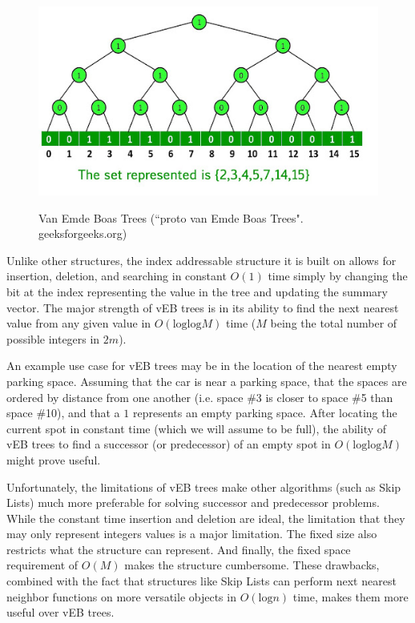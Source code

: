 \documentclass{article}
\begin{document}
\begin{figure}[h]
    \centering
    \includegraphics[scale=0.5,keepaspectratio]{Images/vebtree.jpg}
    \label{fig:veb_tree}
    \caption{Van Emde Boas Trees (``proto van Emde Boas Trees". geeksforgeeks.org)}
\end{figure}

Unlike other structures, the index addressable structure it is built on allows for insertion, deletion, and searching in constant $O(1)$ time simply by changing the bit at the index representing the value in the tree and updating the summary vector. The major strength of vEB trees is in its ability to find the next nearest value from any given value in $O(\text{log}\text{log} M)$ time ($M$ being the total number of possible integers in $2m$).

An example use case for vEB trees may be in the location of the nearest empty parking space. Assuming that the car is near a parking space, that the spaces are ordered by distance from one another (i.e. space \#3 is closer to space \#5 than space \#10), and that a $1$ represents an empty parking space. After locating the current spot in constant time (which we will assume to be full), the ability of vEB trees to find a successor (or predecessor) of an empty spot in $O(\text{log}\text{log} M)$ might prove useful.

Unfortunately, the limitations of vEB trees make other algorithms (such as Skip Lists) much more preferable for solving successor and predecessor problems. While the constant time insertion and deletion are ideal, the limitation that they may only represent integers values is a major limitation. The fixed size also restricts what the structure can represent. And finally, the fixed space requirement of $O(M)$ makes the structure cumbersome. These drawbacks, combined with the fact that structures like Skip Lists can perform next nearest neighbor functions on more versatile objects in $O(\text{log} n)$ time, makes them more useful over vEB trees.
\end{document}
